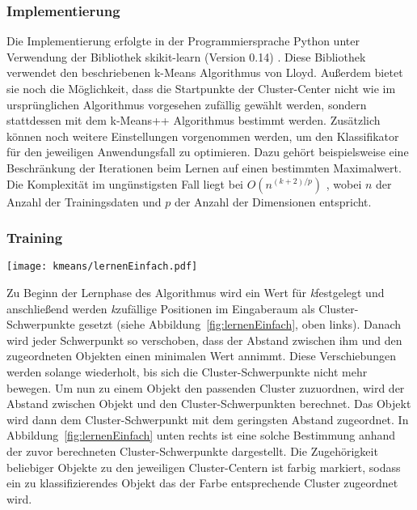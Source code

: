 \subsubsection{Implementierung} \label{subsubsec:kMeansImpl}%
Die Implementierung erfolgte in der Programmiersprache Python unter Verwendung der Bibliothek skikit-learn (Version 0.14) \cite{sklearn}. Diese Bibliothek verwendet den beschriebenen k-Means Algorithmus von Lloyd. Außerdem bietet sie noch die Möglichkeit, dass die Startpunkte der Cluster-Center nicht wie im ursprünglichen Algorithmus vorgesehen zufällig gewählt werden, sondern stattdessen mit dem k-Means++ Algorithmus \cite{kMeans++} bestimmt werden. Zusätzlich können noch weitere 
Einstellungen vorgenommen werden, um den Klassifikator für den jeweiligen Anwendungsfall  zu optimieren. Dazu gehört beispielsweise eine Beschränkung der Iterationen beim Lernen auf einen bestimmten Maximalwert.
Die Komplexität im ungünstigsten Fall liegt bei $O(n^{(k+2)/p})$ \cite{sklearn.kmeans, kMeansHowSlow}, wobei $n$ der Anzahl der Trainingsdaten und $p$ der Anzahl der Dimensionen entspricht.


\subsubsection{Training} \label{subsubsec:kMeansTraining}

\begin{figure*}[htbp]
    \centering
   \texttt{[image: kmeans/lernenEinfach.pdf]}
\caption{Trainingsphase beim k-Means Algorithmus}
\label{fig:lernenEinfach}

\end{figure*}


Zu Beginn der Lernphase des Algorithmus wird ein Wert für \emph{k}festgelegt und anschließend werden \emph{k}zufällige Positionen im Eingaberaum als Cluster-Schwerpunkte gesetzt (siehe Abbildung~\ref{fig:lernenEinfach}, oben links). Danach wird jeder Schwerpunkt so verschoben, dass der Abstand zwischen ihm und den zugeordneten Objekten einen minimalen Wert annimmt. Diese Verschiebungen werden solange wiederholt, bis sich die Cluster-Schwerpunkte nicht mehr bewegen. 
Um nun zu einem Objekt den passenden Cluster zuzuordnen, wird der Abstand zwischen Objekt und den Cluster-Schwerpunkten berechnet. Das Objekt wird dann dem Cluster-Schwerpunkt mit dem geringsten Abstand zugeordnet. In Abbildung~\ref{fig:lernenEinfach} unten rechts ist  eine solche Bestimmung anhand der zuvor berechneten Cluster-Schwerpunkte dargestellt. Die Zugehörigkeit beliebiger Objekte zu den jeweiligen Cluster-Centern ist farbig markiert, sodass ein zu klassifizierendes Objekt das der Farbe entsprechende Cluster zugeordnet wird.

